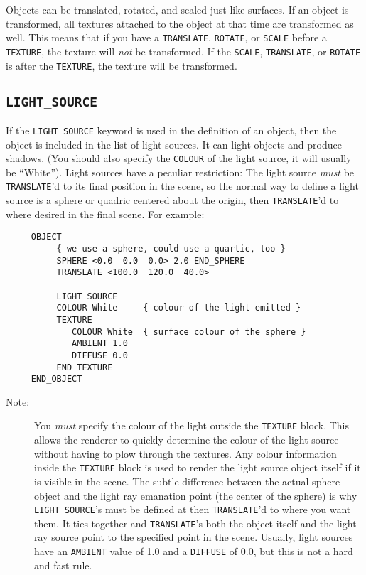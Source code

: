 Objects can be translated, rotated, and scaled just like surfaces.
If
an object is transformed, all textures attached to the object at that
time are transformed as well.  This means that if you have a
{\tt TRANSLATE},
{\tt ROTATE},
or {\tt SCALE} before a {\tt TEXTURE}, the
texture will {\em not} be transformed.  If the {\tt SCALE},
{\tt TRANSLATE}, or {\tt ROTATE} is after the {\tt TEXTURE}, the texture
will be transformed.

\subsection{{\tt LIGHT_SOURCE}}

If the {\tt LIGHT_SOURCE} keyword is used
in the definition of an
object, then the object is included in the list of light sources.  It
can light objects and produce shadows.  (You should also specify the
{\tt COLOUR} of the light source, it will usually be ``White'').
Light sources have a peculiar
restriction:
The light source {\em must}
be {\tt TRANSLATE}'d to its final position in the scene, so the normal
way to define a light source is a sphere or quadric centered about the
origin, then {\tt TRANSLATE}'d to where desired in the final scene.
For example:
\begin{verbatim}
     OBJECT
          { we use a sphere, could use a quartic, too }
          SPHERE <0.0  0.0  0.0> 2.0 END_SPHERE
          TRANSLATE <100.0  120.0  40.0>

          LIGHT_SOURCE
          COLOUR White     { colour of the light emitted }
          TEXTURE
             COLOUR White  { surface colour of the sphere }
             AMBIENT 1.0
             DIFFUSE 0.0
          END_TEXTURE
     END_OBJECT
\end{verbatim}

\begin{description}
\item[Note:] You {\em must}
specify the colour of the light outside the
{\tt TEXTURE} block. This allows the renderer to quickly determine the
colour of the light source without having to plow through the
textures.  Any colour information inside the {\tt TEXTURE} block is
used to render the light source object itself if it is visible in the
scene.  The subtle difference between the actual sphere object and the
light ray emanation point (the center of the sphere) is why
{\tt LIGHT_SOURCE}'s must be defined at {\tt <0,0,0>} then
{\tt TRANSLATE}'d to where you want them.  It ties together and
{\tt TRANSLATE}'s both the object itself and the light ray source point to
the specified point in the scene.  Usually, light sources have an
{\tt AMBIENT} value of 1.0 and a {\tt DIFFUSE} of 0.0, but this is not a
hard and fast rule.
\end{description}

